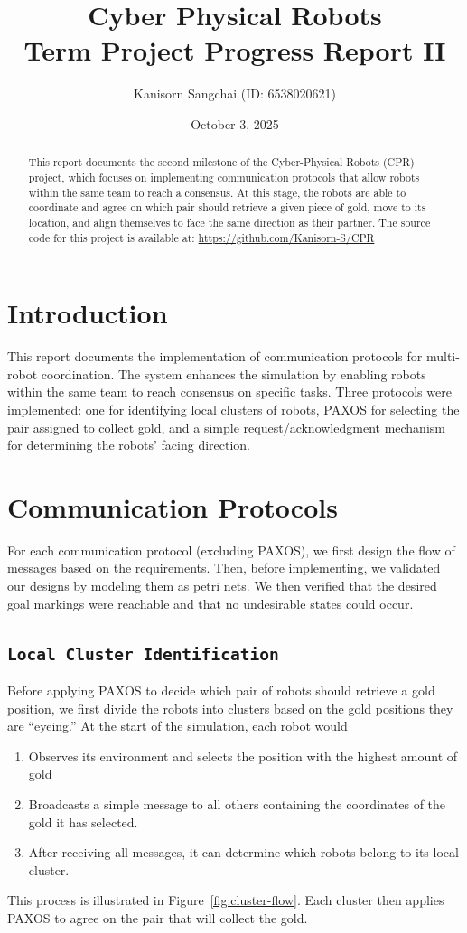 \documentclass[12pt,a4paper]{article}
\title{Cyber Physical Robots\\Term Project Progress Report II}
\author{Kanisorn Sangchai (ID: 6538020621)}
\date{October 3, 2025}
\begin{document}
\maketitle

\begin{abstract}
This report documents the second milestone of the Cyber-Physical Robots (CPR) project, which focuses on implementing communication protocols that allow robots within the same team to reach a consensus. At this stage, the robots are able to coordinate and agree on which pair should retrieve a given piece of gold, move to its location, and align themselves to face the same direction as their partner. The source code for this project is available at: \url{https://github.com/Kanisorn-S/CPR}
\end{abstract}

\section{Introduction}
This report documents the implementation of communication protocols for multi-robot coordination. The system enhances the simulation by enabling robots within the same team to reach consensus on specific tasks. Three protocols were implemented: one for identifying local clusters of robots, PAXOS for selecting the pair assigned to collect gold, and a simple request/acknowledgment mechanism for determining the robots’ facing direction.

\section{Communication Protocols}
For each communication protocol (excluding PAXOS), we first design the flow of messages based on the requirements. Then, before implementing, we validated our designs by modeling them as petri nets. We then verified that the desired goal markings were reachable and that no undesirable states could occur.

\subsection{\texttt{Local Cluster Identification}}
Before applying PAXOS to decide which pair of robots should retrieve a gold position, we first divide the robots into clusters based on the gold positions they are “eyeing.” At the start of the simulation, each robot would
\begin{enumerate}
    \item Observes its environment and selects the position with the highest amount of gold
    \item Broadcasts a simple message to all others containing the coordinates of the gold it has selected.
    \item After receiving all messages, it can determine which robots belong to its local cluster.
\end{enumerate}
This process is illustrated in Figure~\ref{fig:cluster-flow}.
Each cluster then applies PAXOS to agree on the pair that will collect the gold.
\end{document}
